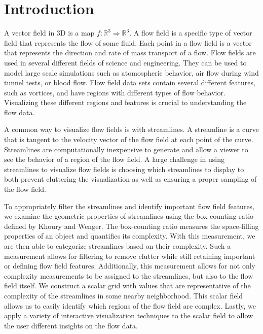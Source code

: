 \documentclass{egpubl}
\newcommand {\emath}[1]  {\ensuremath{#1}}
\newcommand {\Real}[1]   {\emath{\mathbb{R}^{#1}}}   %
\newcommand {\Rthree}    {\Real{3}}                  %
\begin{document}
\renewcommand{\textfraction}{0.2}
\renewcommand{\dbltopfraction}{0.8}	
\renewcommand{\topfraction}{0.8}	




\section{Introduction}

A vector field in 3D is a map $f: \Rthree \Rightarrow \Rthree$.
A flow field is a specific type of vector field that represents the flow of some fluid.
Each point in a flow field is a vector that represents the direction and rate of mass transport of a flow.
Flow fields are used in several different fields of science and engineering.
They can be used to model large scale simulations such as atomospheric behavior, air flow during wind tunnel tests, or blood flow.
Flow field data sets contain several different features, such as vortices, and have regions with different types of flow behavior.
Visualizing these different regions and features is crucial to understanding the flow data.

A common way to visualize flow fields is with streamlines.
A streamline is a curve that is tangent to the velocity vector of the flow field at each point of the curve.
Streamlines are computationally inexpensive to generate and allow a viewer to see the behavior of a region of the flow field.
A large challenge in using streamlines to visualize flow fields is choosing which streamlines to display to both prevent cluttering the visualization as well as ensuring a proper sampling of the flow field.

To appropriately filter the streamlines and identify important flow field features, we examine the geometric properties of streamlines using the box-counting ratio defined by Khoury and Wenger.
The box-counting ratio measures the space-filling properties of an object and quantifies its complexity.
With this measurement, we are then able to categorize streamlines based on their complexity.
Such a measurement allows for filtering to remove clutter while still retaining important or defining flow field features.
Additionally, this measurement allows for not only complexity measurements to be assigned to the streamlines, but also to the flow field itself.
We construct a scalar grid with values that are representative of the complexity of the streamlines in some nearby neighborhood.
This scalar field allows us to easily identify which regions of the flow field are complex.
Lastly, we apply a variety of interactive visualization techniques to the scalar field to allow the user different insights on the flow data.
\end{document}
